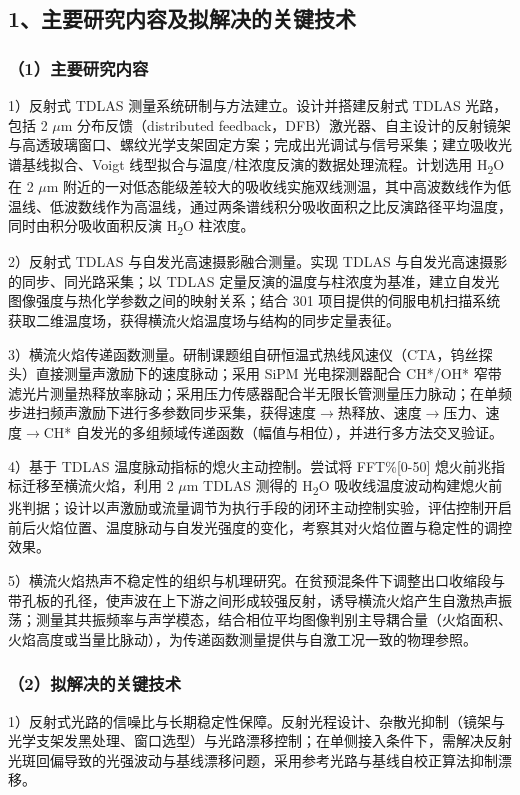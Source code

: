 \documentclass[UTF8,a4paper,zihao=-4,fontset=windows]{ctexart}
\begin{document}
\subsection{1、主要研究内容及拟解决的关键技术}
\subsubsection{（1）主要研究内容}
1）反射式 TDLAS 测量系统研制与方法建立。设计并搭建反射式 TDLAS 光路，包括 2 $\mu$m 分布反馈（distributed feedback，DFB）激光器、自主设计的反射镜架与高透玻璃窗口、螺纹光学支架固定方案；完成出光调试与信号采集；建立吸收光谱基线拟合、Voigt 线型拟合与温度/柱浓度反演的数据处理流程。计划选用 H\textsubscript{2}O 在 2 $\mu$m 附近的一对低态能级差较大的吸收线实施双线测温，其中高波数线作为低温线、低波数线作为高温线，通过两条谱线积分吸收面积之比反演路径平均温度，同时由积分吸收面积反演 H\textsubscript{2}O 柱浓度。

2）反射式 TDLAS 与自发光高速摄影融合测量。实现 TDLAS 与自发光高速摄影的同步、同光路采集；以 TDLAS 定量反演的温度与柱浓度为基准，建立自发光图像强度与热化学参数之间的映射关系；结合 301 项目提供的伺服电机扫描系统获取二维温度场，获得横流火焰温度场与结构的同步定量表征。

3）横流火焰传递函数测量。研制课题组自研恒温式热线风速仪（CTA，钨丝探头）直接测量声激励下的速度脉动；采用 SiPM 光电探测器配合 CH*/OH* 窄带滤光片测量热释放率脉动；采用压力传感器配合半无限长管测量压力脉动；在单频步进扫频声激励下进行多参数同步采集，获得速度$\rightarrow$热释放、速度$\rightarrow$压力、速度$\rightarrow$CH* 自发光的多组频域传递函数（幅值与相位），并进行多方法交叉验证。

4）基于 TDLAS 温度脉动指标的熄火主动控制。尝试将 FFT\%[0-50] 熄火前兆指标迁移至横流火焰，利用 2 $\mu$m TDLAS 测得的 H\textsubscript{2}O 吸收线温度波动构建熄火前兆判据；设计以声激励或流量调节为执行手段的闭环主动控制实验，评估控制开启前后火焰位置、温度脉动与自发光强度的变化，考察其对火焰位置与稳定性的调控效果。

5）横流火焰热声不稳定性的组织与机理研究。在贫预混条件下调整出口收缩段与带孔板的孔径，使声波在上下游之间形成较强反射，诱导横流火焰产生自激热声振荡；测量其共振频率与声学模态，结合相位平均图像判别主导耦合量（火焰面积、火焰高度或当量比脉动），为传递函数测量提供与自激工况一致的物理参照。

\subsubsection{（2）拟解决的关键技术}
1）反射式光路的信噪比与长期稳定性保障。反射光程设计、杂散光抑制（镜架与光学支架发黑处理、窗口选型）与光路漂移控制；在单侧接入条件下，需解决反射光斑回偏导致的光强波动与基线漂移问题，采用参考光路与基线自校正算法抑制漂移。
\end{document}
